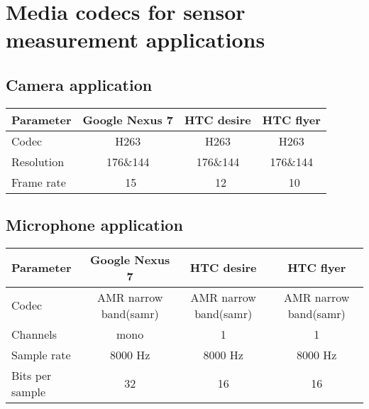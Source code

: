 \section{Media codecs for sensor measurement applications}
\label{s:mediacodecs}

\subsection{Camera application}	

\begin{table}[H]
	\centering
    \begin{tabular}{| l | c | c | c |}
    \hline
    Parameter & Google Nexus 7 & HTC desire & HTC flyer\\ \hline
    Codec                  & H263 & H263 & H263 \\ \hline
    Resolution          & 176\&144 & 176\&144 & 176\&144 \\ \hline
    Frame rate & ~15 & ~12 & ~10 \\ \hline
    \end{tabular}
\end{table}				
					
\subsection{Microphone application}		
			
\begin{table}[H]
	\centering
    \begin{tabular}{| l | c | c | c |}
    \hline
    Parameter & Google Nexus 7 & HTC desire & HTC flyer \\ \hline
    Codec                  & AMR narrow band(samr) & AMR narrow band(samr) & AMR narrow band(samr) \\ \hline
    Channels          & mono & 1 & 1 \\ \hline
    Sample rate          & 8000 Hz & 8000 Hz & 8000 Hz \\ \hline
    Bits per sample & 32 & 16 & 16 \\ \hline
    \end{tabular}
\end{table}	
